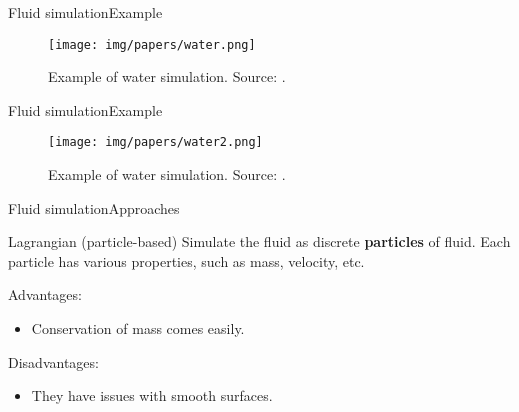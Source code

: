 \documentclass[10pt]{beamer}
\newcommand{\1}{
        	\setbeamertemplate{background}{
        		\texttt{[image: img/1]}
        		\tikz[overlay] \fill[fill opacity=0.75,fill=white] (0,0) rectangle (-\paperwidth,\paperheight);
        	}
}
\begin{document}
\begin{frame}{Fluid simulation}{Example}	
	\begin{figure}
		\centering
		\texttt{[image: img/papers/water.png]}
		\caption{Example of water simulation. Source: \cite{ando2020practical}.}
	\end{figure}
\end{frame}

\begin{frame}{Fluid simulation}{Example}	
	\begin{figure}
		\centering
		\texttt{[image: img/papers/water2.png]}
		\caption{Example of water simulation. Source: \cite{ando2020practical}.}
	\end{figure}
\end{frame}


\begin{frame}{Fluid simulation}{Approaches}	
	\begin{block}{Lagrangian (particle-based)}
		Simulate the fluid as discrete \textbf{particles} of fluid.  Each particle has various properties, such as mass, velocity, etc. 
	\end{block}

	Advantages: 
	\begin{itemize}
		\item Conservation of mass comes easily.
	\end{itemize}

	Disadvantages: 
	\begin{itemize}
		\item They have issues with smooth surfaces.
	\end{itemize}	
	
\end{frame}
\end{document}
